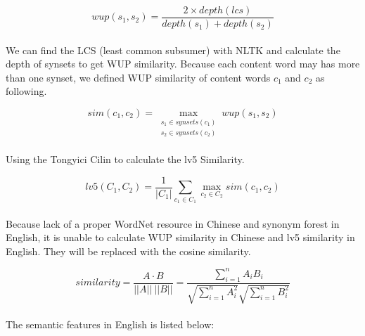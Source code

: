 \documentclass{article}
\begin{document}
\begin{CJK*}{UTF8}{bkai}
\begin{equation}
  wup(s_1,s_2)=\frac{2\times depth(lcs)}{depth(s_1)+depth(s_2)}
\end{equation}

\paragraph{}
We can find the LCS (least common subsumer) with NLTK and calculate the depth of synsets to get WUP similarity. Because each content word may has more than one synset, we defined WUP similarity of content words $c_1$ and $c_2$ as following.

\begin{equation}
  sim(c_1,c_2)=\max\limits_{\substack{s_1\in synsets(c_1) \\ s_2\in synsets(c_2)}} wup(s_1,s_2)
\end{equation}

\paragraph{}
Using the Tongyici Cilin to calculate the lv5 Similarity.

\begin{equation}
  lv5(C_1,C_2)=\frac{1}{|C_1|}\sum\limits_{c_1\in C_1}\max\limits_{c_2\in C_2} sim(c_1,c_2)
\end{equation}

\paragraph{}
Because lack of a proper WordNet resource in Chinese and synonym forest in English, it is unable to calculate WUP similarity in Chinese and lv5 similarity in English. They will be replaced with the cosine similarity.

\begin{equation}
  similarity=\frac{A\cdot B}{||A||\ ||B||}=\frac{\sum\limits^{n}_{i=1}A_iB_i}{\sqrt{\sum\limits^{n}_{i=1}A^2_i}\sqrt{\sum\limits^{n}_{i=1}B^2_i}}
\end{equation}

\paragraph{}
The semantic features in English is listed below:


\end{CJK*}
\end{document}
